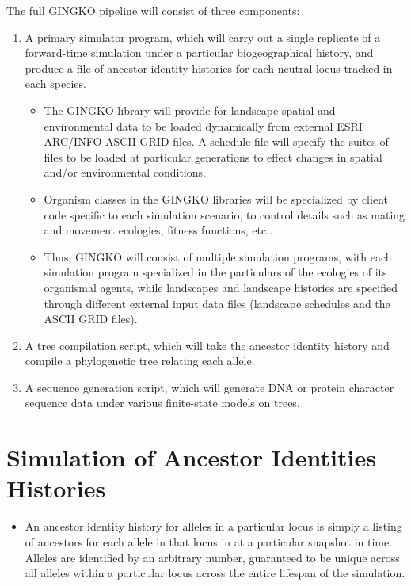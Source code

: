 \documentclass[11pt]{article}
\begin{document}
The full GINGKO pipeline will consist of three components:

\begin{enumerate}
\item A primary simulator program, which will carry out a single replicate of a forward-time simulation under a particular biogeographical history, and produce a file of ancestor identity histories for each neutral locus tracked in each species. 
\begin{itemize}
\item The GINGKO library will provide for landscape spatial and environmental data to be loaded dynamically from external ESRI ARC/INFO ASCII GRID files. A schedule file will specify the suites of files to be loaded at particular generations to effect changes in spatial and/or environmental conditions.
\item Organism classes in the GINGKO libraries will be specialized by client code specific to each simulation scenario, to control details such as mating and movement ecologies, fitness functions, etc..
\item Thus, GINGKO will consist of multiple simulation programs, with each simulation program specialized in the particulars of the ecologies of its organismal agents, while landscapes and landscape histories are specified through different external input data files (landscape schedules and the ASCII GRID files).
\end{itemize}
\item A tree compilation script, which will take the ancestor identity history and compile a phylogenetic tree relating each allele.
\item A sequence generation script, which will generate DNA or protein character sequence data under various finite-state models on trees.
\end{enumerate}




\section{Simulation of Ancestor Identities Histories}

\begin{itemize}

\item An ancestor identity history for alleles in a particular locus is simply a listing of ancestors for each allele in that locus in at a particular snapshot in time. Alleles are identified by an arbitrary number, guaranteed to be unique across all alleles within a particular locus across the entire lifespan of the simulation.



\end{itemize}
\end{document}
